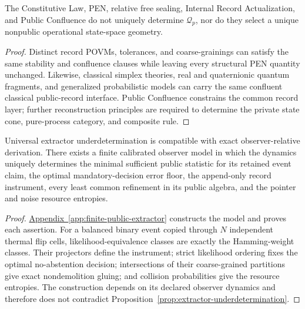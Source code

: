 \begin{proposition}\label{prop:extractor-underdetermination}
The Constitutive Law, PEN, relative free sealing, Internal Record Actualization,
and Public Confluence do not uniquely determine \(\mathcal Q_p\), nor do they
select a unique nonpublic operational state-space geometry.
\end{proposition}

\begin{proof}
Distinct record POVMs, tolerances, and coarse-grainings can satisfy the same
stability and confluence clauses while leaving every structural PEN quantity
unchanged. Likewise, classical simplex theories, real and quaternionic quantum
fragments, and generalized probabilistic models can carry the same confluent
classical public-record interface. Public Confluence constrains the common
record layer; further reconstruction principles are required to determine the
private state cone, pure-process category, and composite rule.
\end{proof}

\begin{proposition}\label{prop:model-relative-extractor}
Universal extractor underdetermination is compatible with exact
observer-relative derivation.  There exists a finite calibrated observer model
in which the dynamics uniquely determines the minimal sufficient public
statistic for its retained event claim, the optimal mandatory-decision error
floor, the append-only record instrument, every least common refinement in its
public algebra, and the pointer and noise resource entropies.
\end{proposition}

\begin{proof}
\hyperref[app:finite-public-extractor]{Appendix~\ref*{app:finite-public-extractor}}
constructs the model and proves each assertion.  For a balanced binary event
copied through \(N\) independent thermal flip cells, likelihood-equivalence
classes are exactly the Hamming-weight classes.  Their projectors define the
instrument; strict likelihood ordering fixes the optimal no-abstention
decision; intersections of their coarse-grained partitions give exact
nondemolition gluing; and collision probabilities give the resource
entropies.  The construction depends on its declared observer dynamics and
therefore does not contradict Proposition~\ref{prop:extractor-underdetermination}.
\end{proof}

